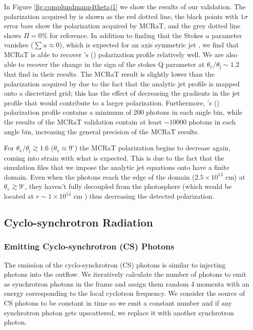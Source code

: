 \documentclass[12pt,a4paper]{article}
\begin{document}
In Figure \ref{fig:complundmanp4thetaj1} we show the results of our validation. The polarization acquired by \cite{lundman2014polarization} is shown as the red dotted line, the black points with $1\sigma$ error bars show the polarization acquired by MCRaT, and the grey dotted line shows $\Pi=0\%$ for reference. In addition to finding that the Stokes $u$ parameter vanishes ($\sum u \approx 0$), which is expected for an axis symmetric jet \citep{ito_polarization, lundman2014polarization}, we find that MCRaT is able to recover \citeauthor{lundman2014polarization}'s (\citeyear{lundman2014polarization}) polarization profile relatively well. {We are also able to recover the change in the sign of the stokes Q parameter at $\theta_{\mathrm{v}}/\theta_{\mathrm{j}} \sim 1.2$ that \cite{lundman2014polarization} find in their results.
The MCRaT result is slightly lower than the polarization acquired by \cite{lundman2014polarization} due to the fact that the analytic jet profile is mapped onto a discretized grid; this has the effect of decreasing the gradients in the jet profile that would contribute to a larger polarization. 
Furthermore, \citeauthor{lundman2014polarization}'s (\citeyear{lundman2014polarization}) polarization profile contains a minimum of 200 photons in each angle bin, while the results of the MCRaT validation contain at least $\sim 10000$ photons in each angle bin, increasing the general precision of the MCRaT results. }

For $\theta_{\mathrm{v}}/\theta_{\mathrm{j}} \gtrsim 1.6$ ($\theta_{\mathrm{v}} \approx 9^\circ$) the MCRaT polarization begins to decrease again, coming into strain with what is expected. This is due to the fact that the simulation files that we impose the analytic jet equations onto have a finite domain. Even when the photons reach the edge of the domain ($2.5 \times 10^{13}$ cm) at $\theta_{\mathrm{v}} \gtrsim 9^\circ$, they haven't fully decoupled from the photosphere (which would be located at $r\sim 1\times 10^{14}$ cm \citep{lundman2014polarization}) thus decreasing the detected polarization. 

\subsection{Cyclo-synchrotron Radiation}\label{synch}
\subsubsection{Emitting Cyclo-synchrotron (CS) Photons}
The emission of the cyclo-synchrotron (CS) photons is similar to injecting photons into the outflow. We iteratively calculate the number of photons to emit as synchrotron photons in the frame and assign them random 4 momenta with an energy corresponding to the local cyclotron frequency. We consider the source of CS photons to be constant in time so we emit a constant number and if any synchrotron photon gets upscattered, we replace it with another synchrotron photon. 
\end{document}
